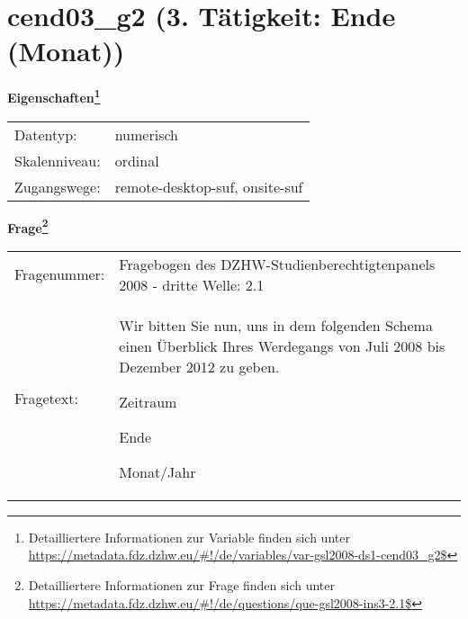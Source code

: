 
    \setcounter{footnote}{0}

    \vspace*{-1.8cm}
	\section{cend03\_g2 (3. Tätigkeit: Ende (Monat))}
	\label{section:cend03_g2}



    \vspace*{0.5cm}
    \noindent\textbf{Eigenschaften\footnote{Detailliertere Informationen zur Variable finden sich unter
		\url{https://metadata.fdz.dzhw.eu/\#!/de/variables/var-gsl2008-ds1-cend03_g2$}}}\\
	\begin{tabularx}{\hsize}{@{}lX}
	Datentyp: & numerisch \\
	Skalenniveau: & ordinal \\
	Zugangswege: &
	  remote-desktop-suf, 
	  onsite-suf
 \\
    \end{tabularx}



				\vspace*{0.5cm}
                \noindent\textbf{Frage\footnote{Detailliertere Informationen zur Frage finden sich unter
		              \url{https://metadata.fdz.dzhw.eu/\#!/de/questions/que-gsl2008-ins3-2.1$}}}\\
				\begin{tabularx}{\hsize}{@{}lX}
					Fragenummer: &
					  Fragebogen des DZHW-Studienberechtigtenpanels 2008 - dritte Welle:
					  2.1
 \\
					Fragetext: & Wir bitten Sie nun, uns in dem folgenden Schema einen Überblick Ihres Werdegangs von Juli 2008 bis Dezember 2012 zu geben.\par  Zeitraum\par  Ende\par  Monat/Jahr \\
				\end{tabularx}





